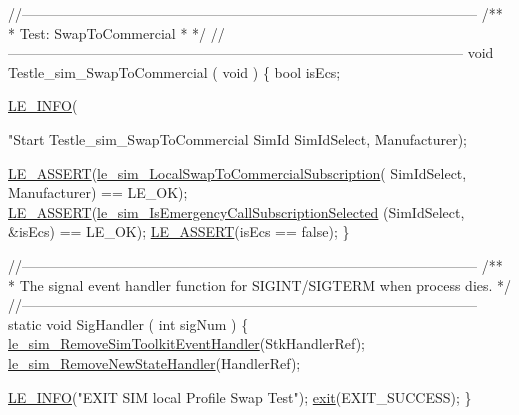 \begin{DoxyCodeInclude}
{{{{{{{{{{{{\textcolor{comment}{//--------------------------------------------------------------------------------------------------}\textcolor{comment}{}
\textcolor{comment}{/**}
\textcolor{comment}{ * Test: SwapToCommercial}
\textcolor{comment}{ *}
\textcolor{comment}{ */}
\textcolor{comment}{//--------------------------------------------------------------------------------------------------}
\textcolor{keywordtype}{void} Testle\_sim\_SwapToCommercial
(
    \textcolor{keywordtype}{void}
)
\{
    \textcolor{keywordtype}{bool} isEcs;

    \hyperlink{le__log_8h_a23e6d206faa64f612045d688cdde5808}{LE\_INFO}(\textcolor{stringliteral}{"Start Testle\_sim\_SwapToCommercial SimId %
        SimIdSelect, Manufacturer);

    \hyperlink{le__log_8h_ac0dbbef91dc0fed449d0092ff0557b39}{LE\_ASSERT}(\hyperlink{le__sim__interface_8h_a51b535750b66c4cf460e3c8c72f3658d}{le\_sim\_LocalSwapToCommercialSubscription}(
      SimIdSelect, Manufacturer) == LE\_OK);
    \hyperlink{le__log_8h_ac0dbbef91dc0fed449d0092ff0557b39}{LE\_ASSERT}(\hyperlink{le__sim__interface_8h_a837cdc0fe30761f4339f846a0b44c5f1}{le\_sim\_IsEmergencyCallSubscriptionSelected}
      (SimIdSelect, &isEcs) == LE\_OK);
    \hyperlink{le__log_8h_ac0dbbef91dc0fed449d0092ff0557b39}{LE\_ASSERT}(isEcs == \textcolor{keyword}{false});
\}

\textcolor{comment}{//--------------------------------------------------------------------------------------------------}\textcolor{comment}{}
\textcolor{comment}{/**}
\textcolor{comment}{ * The signal event handler function for SIGINT/SIGTERM when process dies.}
\textcolor{comment}{ */}
\textcolor{comment}{//--------------------------------------------------------------------------------------------------}
\textcolor{keyword}{static} \textcolor{keywordtype}{void} SigHandler
(
    \textcolor{keywordtype}{int} sigNum
)
\{
    \hyperlink{le__sim__interface_8h_a2485840533f80632a61096b1d7c5d8f2}{le\_sim\_RemoveSimToolkitEventHandler}(StkHandlerRef);
    \hyperlink{le__sim__interface_8h_a0286578e9aa46ba864df1878263b9f84}{le\_sim\_RemoveNewStateHandler}(HandlerRef);

    \hyperlink{le__log_8h_a23e6d206faa64f612045d688cdde5808}{LE\_INFO}(\textcolor{stringliteral}{"EXIT SIM local Profile Swap Test"});
    \hyperlink{app_stop_client_8c_a310220604a584e112ba8f7aa3dfe23f1}{exit}(EXIT\_SUCCESS);
\}

}}}}}}}}}}}}}
\end{DoxyCodeInclude}
